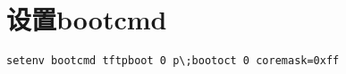 \section{设置bootcmd}
\begin{verbatim}
setenv bootcmd tftpboot 0 p\;bootoct 0 coremask=0xff
\end{verbatim}


